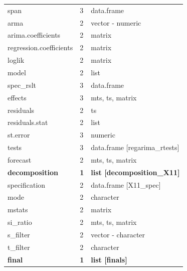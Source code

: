 \documentclass[article]{jss}
\begin{document}
\begin{longtable}{lll}
\hspace{3em}span & 3 & data.frame\\
\addlinespace
\hspace{2em}arma & 2 & vector - numeric\\
\hspace{2em}arima.coefficients & 2 & matrix\\
\hspace{2em}regression.coefficients & 2 & matrix\\
\hspace{2em}loglik & 2 & matrix\\
\hspace{2em}model & 2 & list\\
\addlinespace
\hspace{3em}spec\_rslt & 3 & data.frame\\
\hspace{3em}effects & 3 & mts, ts, matrix\\
\hspace{2em}residuals & 2 & ts\\
\hspace{2em}residuals.stat & 2 & list\\
\hspace{3em}st.error & 3 & numeric\\
\addlinespace
\hspace{3em}tests & 3 & data.frame [regarima\_rtests]\\
\hspace{2em}forecast & 2 & mts, ts, matrix\\
\textbf{\hspace{1em}decomposition} & \textbf{1} & \textbf{list [decomposition\_X11]}\\
\hspace{2em}specification & 2 & data.frame [X11\_spec]\\
\hspace{2em}mode & 2 & character\\
\addlinespace
\hspace{2em}mstats & 2 & matrix\\
\hspace{2em}si\_ratio & 2 & mts, ts, matrix\\
\hspace{2em}s\_filter & 2 & vector - character\\
\hspace{2em}t\_filter & 2 & character\\
\textbf{\hspace{1em}final} & \textbf{1} & \textbf{list [finals]}\\

\end{longtable}
\end{document}
